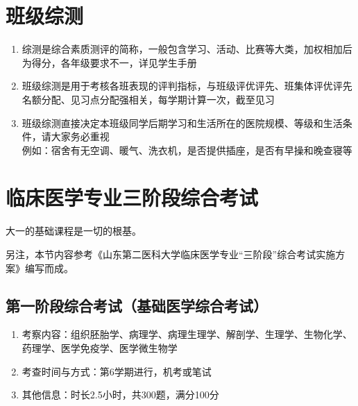 \section[班级综测]{班级综测}
\label{class_evaluation}
\begin{enumerate}
    \item 综测是综合素质测评的简称，一般包含学习、活动、比赛等大类，加权相加后为得分，各年级要求不一，详见学生手册
    \item 班级综测是用于考核各班表现的评判指标，与班级评优评先、班集体评优评先名额分配、见习点分配\footnotemark 强相关，每学期计算一次，截至见习
    \item 班级综测直接决定本班级同学后期学习和生活所在的医院规模、等级和生活条件，请大家务必重视\\
          例如：宿舍有无空调、暖气、洗衣机，是否提供插座，是否有早操和晚查寝\footnotemark 等
\end{enumerate}

\section[临床医学专业三阶段综合考试]{临床医学专业三阶段综合考试}
大一的基础课程是一切的根基。

另注，本节内容参考《山东第二医科大学临床医学专业“三阶段”综合考试实施方案》编写而成。

\subsection[第一阶段综合考试（基础医学综合考试）]{第一阶段综合考试（基础医学综合考试）}
\begin{enumerate}
    \item 考察内容：组织胚胎学、病理学、病理生理学、解剖学、生理学、生物化学、药理学、医学免疫学、医学微生物学
    \item 考查时间与方式：第6学期进行，机考或笔试
    \item 其他信息：时长2.5小时，共300题，满分100分
\end{enumerate}

